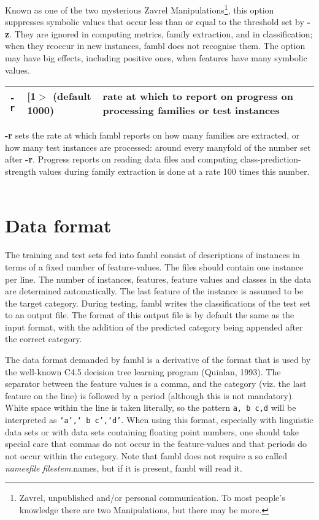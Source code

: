 \documentclass[11pt]{article}
\begin{document}
Known as one of the two mysterious Zavrel
Manipulations\footnote{Zavrel, unpublished and/or personal
communication. To most people's knowledge there are two Manipulations,
but there may be more.}, this option suppresses symbolic values that
occur less than or equal to the threshold set by {\bf -z}. They are
ignored in computing metrics, family extraction, and in
classification; when they reoccur in new instances, {\sc fambl} does
not recognise them. The option may have big effects, including
positive ones, when features have many symbolic values.  
\ \\

\begin{tabular}{|p{}|p{}|p{}|}
\hline
{\tt -r} & [1$>$ (default 1000) & rate at which to report on progress on 
processing families or test instances \\
\hline
\end{tabular}

{\bf -r} sets the rate at which {\sc fambl} reports on how many
families are extracted, or how many test instances are processed:
around every manyfold of the number set after {\bf -r}. Progress
reports on reading data files and computing class-prediction-strength
values during family extraction is done at a rate 100 times this
number.  \ \\

\section{Data format}
\label{format}

The training and test sets fed into {\sc fambl} consist of
descriptions of instances in terms of a fixed number of
feature-values. The files should contain one instance per line. The
number of instances, features, feature values and classes in the data
are determined automatically. The last feature of the instance is
assumed to be the target category. During testing, {\sc fambl} writes
the classifications of the test set to an output file. The format of
this output file is by default the same as the input format, with the
addition of the predicted category being appended after the correct
category.

The data format demanded by {\sc fambl} is a derivative of the format
that is used by the well-known C4.5 decision tree learning program
(Quinlan, 1993).  The separator between the feature values is a comma,
and the category (viz.  the last feature on the line) is followed by a
period (although this is not mandatory). White space within the line
is taken literally, so the pattern {\tt a, b c,d} will be interpreted
as {\tt `a',` b c',`d'}.  When using this format, especially with
linguistic data sets or with data sets containing floating point
numbers, one should take special care that commas do not occur in the
feature-values and that periods do not occur within the category.
Note that {\sc fambl} does not require a so called {\em namesfile}
{\sl filestem}.names, but if it is present, {\sc fambl} will read it.
\end{document}
